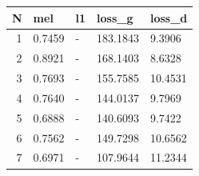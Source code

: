 \begin{tabular}{rllll}
\toprule
N & mel & l1 & loss_g & loss_d \\
\midrule
1 & 0.7459 & - & 183.1843 & 9.3906 \\
2 & 0.8921 & - & 168.1403 & 8.6328 \\
3 & 0.7693 & - & 155.7585 & 10.4531 \\
4 & 0.7640 & - & 144.0137 & 9.7969 \\
5 & 0.6888 & - & 140.6093 & 9.7422 \\
6 & 0.7562 & - & 149.7298 & 10.6562 \\
7 & 0.6971 & - & 107.9644 & 11.2344 \\
\bottomrule
\end{tabular}
